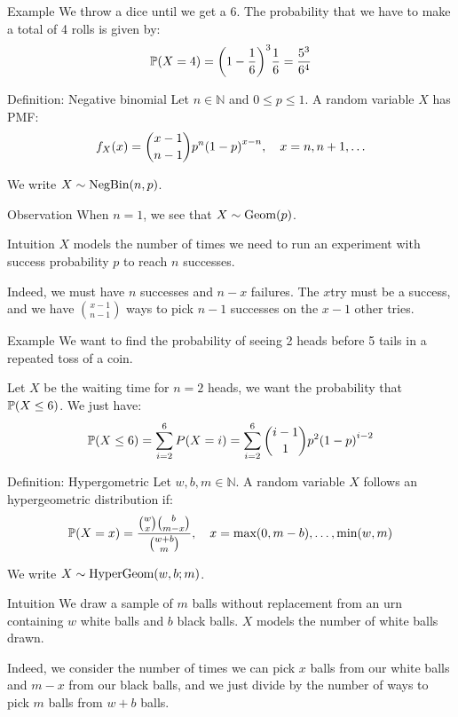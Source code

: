 \documentclass[a4paper]{article}
\begin{document}
\begin{parag}{Example}
    We throw a dice until we get a 6. The probability that we have to make a total of 4 rolls is given by: 
    \[\prob\left(X = 4\right) = \left(1 - \frac{1}{6}\right)^{3} \frac{1}{6} = \frac{5^3}{6^4}\]
\end{parag}


\begin{parag}{Definition: Negative binomial}
    Let $n \in \mathbb{N}$ and $0 \leq p \leq 1$. A  random variable $X$ has PMF: 
    \[f_X\left(x\right) = \binom{x-1}{n-1} p^n \left(1 - p\right)^{x-n}, \mathspace x = n, n+1, \ldots\]
    
    We write $X \followsdistr \text{NegBin}\left(n, p\right)$.

    \begin{subparag}{Observation}
        When $n = 1$, we see that $X \followsdistr \text{Geom}\left(p\right)$.
    \end{subparag}

    \begin{subparag}{Intuition}
        $X$ models the number of times we need to run an experiment with success probability $p$ to reach $n$ successes.

        Indeed, we must have $n$ successes and $n - x$ failures. The $x$\Th try must be a success, and we have $\binom{x-1}{n-1}$ ways to pick $n-1$ successes on the $x-1$ other tries. 
    \end{subparag}
\end{parag}

\begin{parag}{Example}
    We want to find the probability of seeing 2 heads before 5 tails in a repeated toss of a coin.

    Let $X$ be the waiting time for $n = 2$ heads, we want the probability that $\prob\left(X \leq 6\right)$. We just have: 
    \[\prob\left(X \leq6\right) = \sum_{i=2}^{6} P\left(X = i\right) = \sum_{i=2}^{6} \binom{i-1}{1} p^2 \left(1 - p\right)^{i - 2}\]
\end{parag}

\begin{parag}{Definition: Hypergometric}
    Let $w, b, m \in \mathbb{N}$. A random variable $X$ follows an hypergeometric distribution if: 
    \[\prob\left(X = x\right) = \frac{\binom{w}{x}\binom{b}{m-x}}{\binom{w+b}{m}}, \mathspace x = \text{max}\left(0, m-b\right), \ldots, \text{min}\left(w, m\right)\]
    
    We write $X \followsdistr \text{HyperGeom}\left(w, b; m\right)$.

    \begin{subparag}{Intuition}
        We draw a sample of $m$ balls without replacement from an urn containing $w$ white balls and $b$ black balls. $X$ models the number of white balls drawn.

        Indeed, we consider the number of times we can pick $x$ balls from our white balls and $m-x$ from our black balls, and we just divide by the number of ways to pick $m$ balls from $w + b$ balls.
    \end{subparag}
\end{parag}
\end{document}
